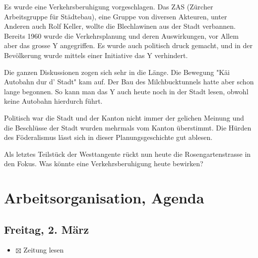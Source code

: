 \documentclass[a4paper,11pt,ngerman]{article}
\begin{document}
Es wurde eine Verkehrsberuhigung vorgeschlagen. Das ZAS (Zürcher
Arbeitsgruppe für Städtebau), eine Gruppe von diversen Akteuren, unter
Anderen auch Rolf Keller, wollte die Blechlawinen aus der Stadt
verbannen. Bereits 1960 wurde die Verkehrsplanung und deren Auswirkungen,
vor Allem aber das grosse Y angegriffen. Es wurde auch politisch druck
gemacht, und in der Bevölkerung wurde mittels einer Initiative das Y
verhindert.

Die ganzen Diskussionen zogen sich sehr in die Länge. Die Bewegung "Käi
Autobahn dur d' Stadt" kam auf. Der Bau des Milchbucktunnels hatte aber
schon lange begonnen. So kann man das Y auch heute noch in der Stadt lesen,
obwohl keine Autobahn hierdurch führt.

Politisch war die Stadt und der Kanton nicht immer der gelichen Meinung und
die Beschlüsse der Stadt wurden mehrmals vom Kanton überstimmt. Die Hürden
des Föderalismus lässt sich in dieser Planungsgeschichte gut ablesen.

Als letztes Teilstück der Westtangente rückt nun heute die
Rosengartenstrasse in den Fokus. Was könnte eine Verkehrsberuhigung heute
bewirken?

\section{Arbeitsorganisation, Agenda}
\label{sec-3}

\subsection{Freitag, 2. März}
\label{sec-3-1}

\begin{itemize}
\item $\boxtimes$ Zeitung lesen
\end{itemize}
\end{document}
